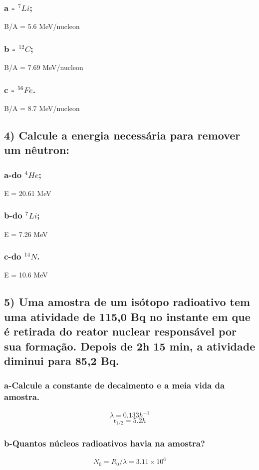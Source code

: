 \documentclass{article}
\begin{document}
\subsubsection*{a - ${}^7Li$;}
B/A = 5.6 MeV/nucleon
\subsubsection*{b - ${}^{12}C$;}
B/A = 7.69 MeV/nucleon
\subsubsection*{c - ${}^{56}Fe$.}
B/A = 8.7 MeV/nucleon

\subsection*{4) Calcule a energia necessária para remover um nêutron:}
\subsubsection*{a-do ${}^{4}He$;}
E = 20.61 MeV
\subsubsection*{b-do ${}^{7}Li$;}
E = 7.26 MeV
\subsubsection*{c-do ${}^{14}N$.}
E = 10.6 MeV

\subsection*{5) Uma amostra de um isótopo radioativo tem uma atividade de 115,0 Bq no instante em que é retirada do reator nuclear responsável por sua formação. Depois de 2h 15 min, a atividade diminui para 85,2 Bq.}

\subsubsection*{a-Calcule a constante de decaimento e a meia vida da amostra.}

\[\lambda = 0.133 h^{-1}\]
\[t_{1/2} = 5.2 h\]

\subsubsection*{b-Quantos núcleos radioativos havia na amostra?}
\[N_0 = R_0/\lambda = 3.11 \times 10^6\]
\end{document}
